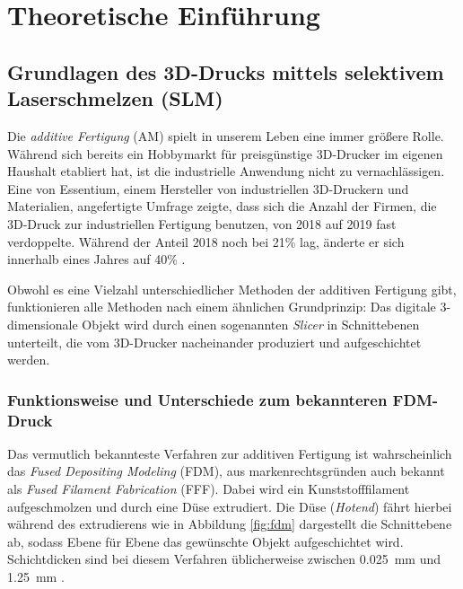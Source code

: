 \chapter{Theoretische Einführung}



\section{Grundlagen des 3D-Drucks mittels selektivem Laserschmelzen (SLM)}
	Die \emph{additive Fertigung} (AM) spielt in unserem Leben eine immer größere Rolle. Während
	sich bereits ein Hobbymarkt für preisgünstige 3D-Drucker im eigenen Haushalt etabliert hat,
	ist die industrielle Anwendung nicht zu vernachlässigen. Eine von Essentium, einem Hersteller
	von industriellen 3D-Druckern und Materialien, angefertigte Umfrage zeigte, dass sich die
	Anzahl der Firmen, die 3D-Druck zur industriellen Fertigung benutzen, von 2018 auf 2019 fast
	verdoppelte. Während der Anteil 2018 noch bei 21\% lag, änderte er sich innerhalb eines Jahres
	auf 40\% \cite{stevenson2019survey}.

	Obwohl es eine Vielzahl unterschiedlicher Methoden der additiven Fertigung gibt, funktionieren
	alle Methoden nach einem ähnlichen Grundprinzip: Das digitale 3-dimension\-ale Objekt wird
	durch einen sogenannten \emph{Slicer} in Schnittebenen unterteilt, die vom 3D-Drucker
	nacheinander produziert und aufgeschichtet werden.

	\subsection{Funktionsweise und Unterschiede zum bekannteren FDM-Druck}
		Das vermutlich bekannteste Verfahren zur additiven Fertigung ist wahrscheinlich das
		\emph{Fused Depositing Modeling} (FDM), aus markenrechtsgründen auch bekannt als
		\emph{Fused Filament Fabrication} (FFF). Dabei wird ein Kunststofffilament aufgeschmolzen
		und durch eine Düse extrudiert. Die Düse (\emph{Hotend}) fährt hierbei während des
		extrudierens wie in Abbildung \ref{fig:fdm} dargestellt die Schnittebene ab, sodass
		Ebene für Ebene das gewünschte Objekt aufgeschichtet wird. Schichtdicken sind bei diesem
		Verfahren üblicherweise zwischen \SI{0,025}{\milli\meter} und \SI{1,25}{\milli\meter}
		\cite{wikipedia2021fused}.

